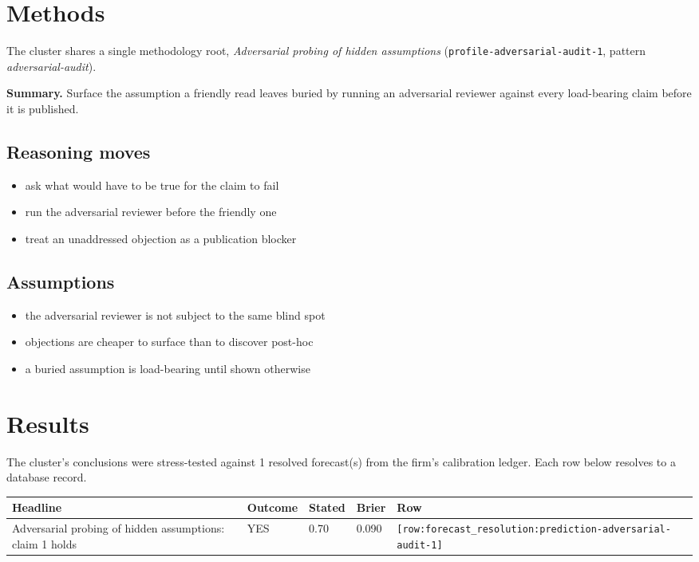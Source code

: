 \documentclass[11pt,letterpaper]{article}
\newcommand{\rowref}[1]{\texttt{\small[row:#1]}}
\begin{document}
\section{Methods}
The cluster shares a single methodology root,
\textit{Adversarial probing of hidden assumptions} (\texttt{profile-adversarial-audit-1}, pattern \emph{adversarial-audit}).

\textbf{Summary.} Surface the assumption a friendly read leaves buried by running an adversarial reviewer against every load-bearing claim before it is published.

\subsection*{Reasoning moves}
\begin{itemize}[leftmargin=1.5em]
  \item ask what would have to be true for the claim to fail
  \item run the adversarial reviewer before the friendly one
  \item treat an unaddressed objection as a publication blocker
\end{itemize}
\subsection*{Assumptions}
\begin{itemize}[leftmargin=1.5em]
  \item the adversarial reviewer is not subject to the same blind spot
  \item objections are cheaper to surface than to discover post-hoc
  \item a buried assumption is load-bearing until shown otherwise
\end{itemize}
\section{Results}
The cluster's conclusions were stress-tested against
1 resolved forecast(s) from the firm's
calibration ledger. Each row below resolves to a database record.

\begin{center}
\begin{tabular}{@{}p{} p{} p{} p{} p{}@{}}
\toprule
\textbf{Headline} & \textbf{Outcome} & \textbf{Stated} & \textbf{Brier} & \textbf{Row} \\
\midrule
Adversarial probing of hidden assumptions: claim 1 holds & YES & 0.70 & 0.090 & \rowref{forecast\_resolution:prediction-adversarial-audit-1} \\
\bottomrule
\end{tabular}
\end{center}
\end{document}
